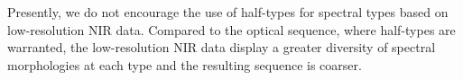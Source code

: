 \documentclass[12pt,preprint]{aastex}
\begin{document}

Presently, we do not encourage the use of half-types for spectral types based on low-resolution NIR data.
Compared to the optical sequence, where half-types are warranted, the low-resolution NIR data display a greater diversity of spectral morphologies at each type and the resulting sequence is coarser.

\end{document}
